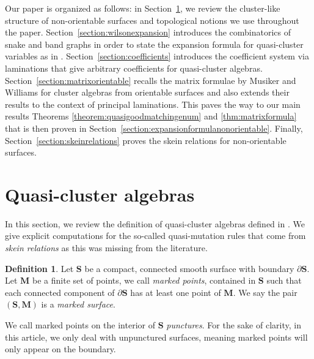 \documentclass[pdftex]{sigma}
\numberwithin{equation}{section}
\theoremstyle{definition}
\newtheorem{Definition}[Theorem]{Definition}
\newcommand{\SM}{(\mathbf{S}, \mathbf{M})}
\begin{document}
Our paper is organized as follows: in Section~\ref{section:quasiclusteralgebras}, we review the cluster-like structure of non-orientable surfaces and topological notions we use throughout the paper. Section~\ref{section:wilsonexpansion} introduces the combinatorics of snake and band graphs in order to state the expansion formula for quasi-cluster variables as in \cite{Wil19}. Section~\ref{section:coefficients} introduces the coefficient system via laminations that give arbitrary coefficients for quasi-cluster algebras. Section~\ref{section:matrixorientable} recalls the matrix formulae by Musiker and Williams for cluster algebras from orientable surfaces and also extends their results to the context of principal laminations. This paves the way to our main results Theorems \ref{theorem:quasigoodmatchingenum} and \ref{thm:matrixformula} that is then proven in Section~\ref{section:expansionformulanonorientable}. Finally, Section~\ref{section:skeinrelations} proves the skein relations for non-orientable surfaces.

\section{Quasi-cluster algebras}\label{section:quasiclusteralgebras}
In this section, we review the definition of quasi-cluster algebras defined in \cite{DP15}. We give explicit computations for the so-called quasi-mutation rules that come from \textit{skein relations} as this was missing from the literature.
\begin{Definition} \label{definition::markedsurface}
Let $\mathbf{S}$ be a compact, connected smooth surface with boundary $\partial \mathbf{S}$. Let $\mathbf{M}$ be a finite set of points, we call \textit{marked points}, contained in $\mathbf{S}$ such that each connected component of $\partial \mathbf{S}$ has at least one point of $\mathbf{M}$. We say the pair $\SM$ is a \textit{marked surface}.
\end{Definition}

We call marked points on the interior of $\mathbf{S}$ \textit{punctures}. For the sake of clarity, in this article, we only deal with unpunctured surfaces, meaning marked points will only appear on the boundary.
\end{document}
